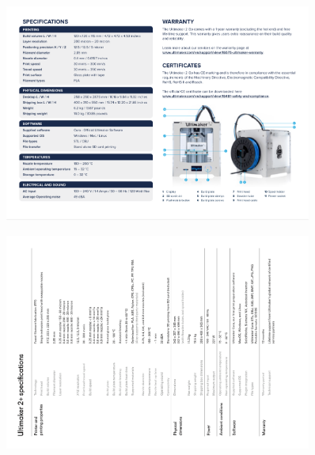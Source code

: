 

\begin{figure}[ht]
    \centering
    \includegraphics[angle=90, width=0.9\textwidth,]{DIV./Dokumenter/UM2Go.jpg}
\end{figure}

\begin{figure}[ht]
    \centering
    \includegraphics[angle=-90, width=0.9\textwidth]{DIV./Dokumenter/UM2+.jpg}
\end{figure}
